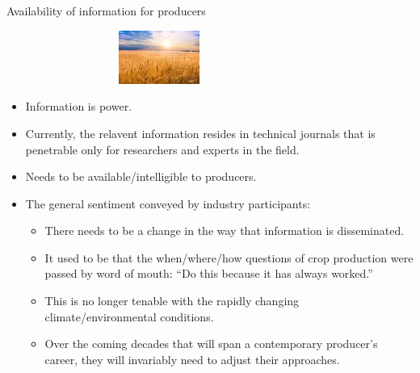 \documentclass[t,9pt,aspectratio=169]{beamer}
\begin{document}
\begin{frame}{Availability of information for producers}

\begin{center}
\includegraphics[width=10cm, height=1.75cm]{./figures/wheat.jpeg}
\end{center}

\begin{itemize}
 \item Information is power.
 \item Currently, the relavent information resides in technical journals that is penetrable only for researchers and experts in the field. 
 \item Needs to be available/intelligible to producers.
 \item The general sentiment conveyed by industry participants:
 \begin{itemize}
 \item There needs to be a change in the way that information is disseminated.
 \item It used to be that the when/where/how questions of crop production were passed by word of mouth: ``Do this because it has always worked.''
 \item This is no longer tenable with the rapidly changing climate/environmental conditions.
 \item Over the coming decades that will span a contemporary producer's career, they will invariably need to adjust their approaches.
 \end{itemize}
\end{itemize}

\end{frame}
\end{document}
